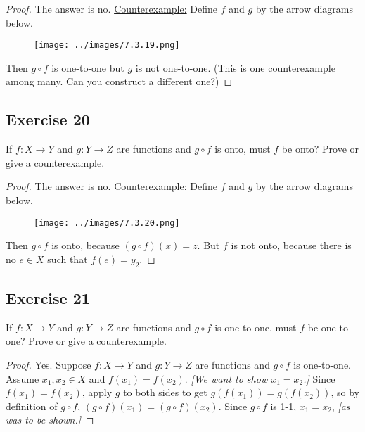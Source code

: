 \documentclass[14pt]{extarticle}
\begin{document}
\begin{proof}
    The answer is no. \underline{Counterexample:} Define $f$ and $g$ by the arrow diagrams below.

    \begin{figure}[ht!]
        \centering
        \texttt{[image: ../images/7.3.19.png]}
    \end{figure}

    Then \(g \circ f\) is one-to-one but $g$ is not one-to-one.
    (This is one counterexample among many. Can you construct a different one?)
\end{proof}

\subsection{Exercise 20}
If \(f: X \to Y\) and \(g: Y \to Z\) are functions and \(g \circ f\) is onto, must $f$ be onto?
Prove or give a counterexample.

\begin{proof}
    The answer is no. \underline{Counterexample:} Define $f$ and $g$ by the arrow diagrams below.

    \begin{figure}[ht!]
        \centering
        \texttt{[image: ../images/7.3.20.png]}
    \end{figure}

    Then \(g \circ f\) is onto, because \((g \circ f)(x) = z\). But $f$ is not onto, because there is no \(e \in X\) such
    that \(f(e) = y_2\).
\end{proof}

\subsection{Exercise 21}
If \(f: X \to Y\) and \(g: Y \to Z\) are functions and \(g \circ f\) is one-to-one, must $f$ be one-to-one?
Prove or give a counterexample.

\begin{proof}
    Yes. Suppose \(f: X \to Y\) and \(g: Y \to Z\) are functions and \(g \circ f\) is one-to-one. Assume
    \(x_1, x_2 \in X\) and \(f(x_1) = f(x_2)\). {\it [We want to show \(x_1 = x_2\).]} Since \(f(x_1) = f(x_2)\), apply
    $g$ to both sides to get \(g(f(x_1)) = g(f(x_2))\), so by definition of \(g \circ f\), \((g \circ f)(x_1) =
    (g \circ f)(x_2)\). Since \(g \circ f\) is 1-1, \(x_1 = x_2\), {\it [as was to be shown.]}

\end{proof}
\end{document}
